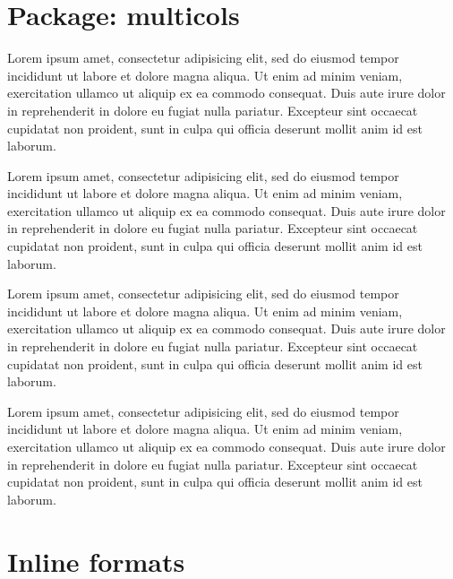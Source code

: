 \documentclass{article}
\begin{document}
\section{Package: multicols}

\begin{multicols}{2}
Lorem ipsum  amet, consectetur adipisicing elit, sed
do eiusmod tempor incididunt ut labore et dolore magna aliqua. Ut enim
ad minim veniam,  exercitation ullamco
 ut aliquip ex ea commodo consequat. Duis aute
irure dolor in reprehenderit in 
dolore eu fugiat nulla pariatur. Excepteur sint occaecat cupidatat non
proident, sunt in culpa qui officia deserunt mollit anim id est laborum.

Lorem ipsum  amet, consectetur adipisicing elit, sed
do eiusmod tempor incididunt ut labore et dolore magna aliqua. Ut enim
ad minim veniam,  exercitation ullamco
 ut aliquip ex ea commodo consequat. Duis aute
irure dolor in reprehenderit in 
dolore eu fugiat nulla pariatur. Excepteur sint occaecat cupidatat non
proident, sunt in culpa qui officia deserunt mollit anim id est laborum.

Lorem ipsum  amet, consectetur adipisicing elit, sed
do eiusmod tempor incididunt ut labore et dolore magna aliqua. Ut enim
ad minim veniam,  exercitation ullamco
 ut aliquip ex ea commodo consequat. Duis aute
irure dolor in reprehenderit in 
dolore eu fugiat nulla pariatur. Excepteur sint occaecat cupidatat non
proident, sunt in culpa qui officia deserunt mollit anim id est laborum.

Lorem ipsum  amet, consectetur adipisicing elit, sed
do eiusmod tempor incididunt ut labore et dolore magna aliqua. Ut enim
ad minim veniam,  exercitation ullamco
 ut aliquip ex ea commodo consequat. Duis aute
irure dolor in reprehenderit in 
dolore eu fugiat nulla pariatur. Excepteur sint occaecat cupidatat non
proident, sunt in culpa qui officia deserunt mollit anim id est laborum.
\end{multicols}

\section{Inline formats}
\end{document}
